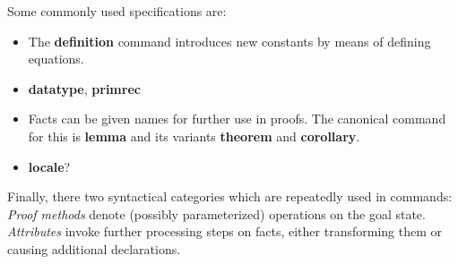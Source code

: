 Some commonly used specifications are:
\begin{itemize}
\item The \textbf{definition} command introduces new constants by means of
	defining equations.
\item \todo{} \textbf{datatype}, \textbf{primrec}
\item Facts can be given names for further use in proofs.
	The canonical command for this is \textbf{lemma} and its variants
	\textbf{theorem} and \textbf{corollary}.
\item \todo{} \textbf{locale}?
\end{itemize}

Finally, there two syntactical categories which are repeatedly used in commands:
\emph{Proof methods} denote (possibly parameterized) operations on the goal state.
\emph{Attributes} invoke further processing steps on facts, either transforming
them or causing additional declarations.

